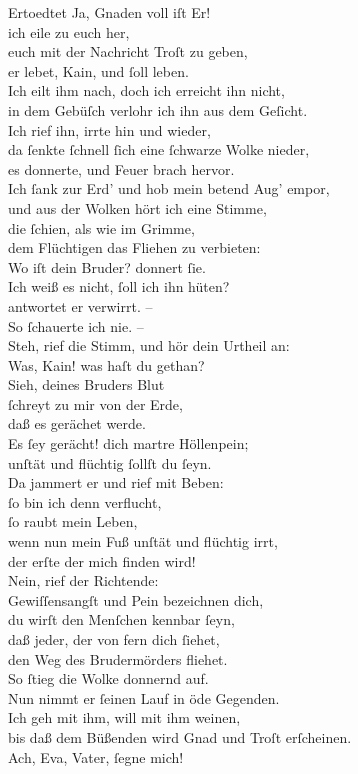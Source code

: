 \documentclass[tocstyle=ref-genre]{ees}
\begin{document}
{\begin{movement}{Ertoedtet}
  \voice[Mehala]
  Ja, Gnaden voll iſt Er!\\
  ich eile zu euch her,\\
  euch mit der Nachricht Troſt zu geben,\\
  er lebet, Kain, und ſoll leben.\\
  Ich eilt ihm nach, doch ich erreicht ihn nicht,\\
  in dem Gebüſch verlohr ich ihn aus dem Geſicht.\\
  Ich rief ihn, irrte hin und wieder,\\
  da ſenkte ſchnell ſich eine ſchwarze Wolke nieder,\\
  es donnerte, und Feuer brach hervor.\\
  Ich ſank zur Erd’ und hob mein betend Aug’ empor,\\
  und aus der Wolken hört ich eine Stimme,\\
  die ſchien, als wie im Grimme,\\
  dem Flüchtigen das Fliehen zu verbieten:\\
  Wo iſt dein Bruder? donnert ſie.\\
  Ich weiß es nicht, ſoll ich ihn hüten?\\
  antwortet er verwirrt. –\\
  So ſchauerte ich nie. –\\
  Steh, rief die Stimm, und hör dein Urtheil an:\\
  Was, Kain! was haſt du gethan?\\
  Sieh, deines Bruders Blut\\
  ſchreyt zu mir von der Erde,\\
  daß es gerächet werde.\\
  Es ſey gerächt! dich martre Höllenpein;\\
  unſtät und flüchtig ſollſt du ſeyn.\\
  Da jammert er und rief mit Beben:\\
  ſo bin ich denn verflucht,\\
  ſo raubt mein Leben,\\
  wenn nun mein Fuß unſtät und flüchtig irrt,\\
  der erſte der mich finden wird!\\
  Nein, rief der Richtende:\\
  Gewiſſensangſt und Pein bezeichnen dich,\\
  du wirſt den Menſchen kennbar ſeyn,\\
  daß jeder, der von fern dich ſiehet,\\
  den Weg des Brudermörders fliehet.\\
  So ſtieg die Wolke donnernd auf.\\
  Nun nimmt er ſeinen Lauf in öde Gegenden.\\
  Ich geh mit ihm, will mit ihm weinen,\\
  bis daß dem Büßenden wird Gnad und Troſt erſcheinen.\\
  Ach, Eva, Vater, ſegne mich!


\end{movement}}
\end{document}
